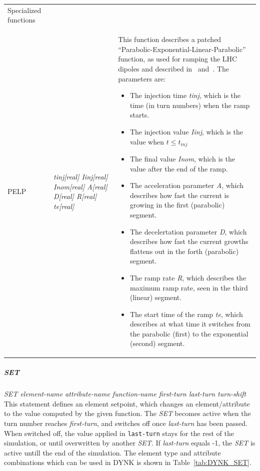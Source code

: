 \documentclass[a4paper,11pt]{report}
\begin{document}
\begin{center}
\begin{longtable}{|p{2.25cm} | p{4cm} p{9.5cm}|}
  \hline
  \rowcolor{blue!15}
  Specialized functions & & \\*

  PELP        & \emph{tinj[real] Iinj[real] Inom[real] A[real] D[real] R[real] te[real]} & 
  This function describes a patched ``Parabolic-Exponential-Linear-Parabolic'' function, as used for ramping the LHC dipoles and described in~\cite[Appendix C]{SRussen:fieldComp} and~\cite{BurlaKing:CurrentRamp}. 
  The parameters are:
  \begin{itemize}
  \setlength\itemsep{-0.3em}
  \item The injection time \emph{tinj}, which is the time (in turn numbers) when the ramp starts.
  \item The injection value \emph{Iinj}, which is the value when $t\le t_{inj}$
  \item The final value \emph{Inom}, which is the value after the end of the ramp.
  \item The acceleration parameter \emph{A}, which describes how fast the current is growing in the first (parabolic) segment.
  \item The decelertation parameter \emph{D}, which describes how fast the current growths flattens out in the forth (parabolic) segment.
  \item The ramp rate \emph{R}, which describes the maximum ramp rate, seen in the third (linear) segment.
  \item The start time of the ramp \emph{te}, which describes at what time it switches from the parabolic (first) to the exponential (second) segment.
  \end{itemize}
  \\*
\end{longtable}
\end{center}


\subparagraph{SET} \emph{SET element-name attribute-name function-name first-turn last-turn turn-shift}\\
This statement defines an element setpoint, which changes an element/attribute to the value computed by the given function.
The \emph{SET} becomes active when the turn number reaches \emph{first-turn}, and switches off once \emph{last-turn} has been passed.
When switched off, the value applied in \texttt{last-turn} stays for the rest of the simulation, or until overwritten by another \emph{SET}.
If \emph{last-turn} equals -1, the \emph{SET} is active untill the end of the simulation.
The element type and attribute combinations which can be used in DYNK is shown in Table~\ref{tab:DYNK_SET}.
\end{document}
